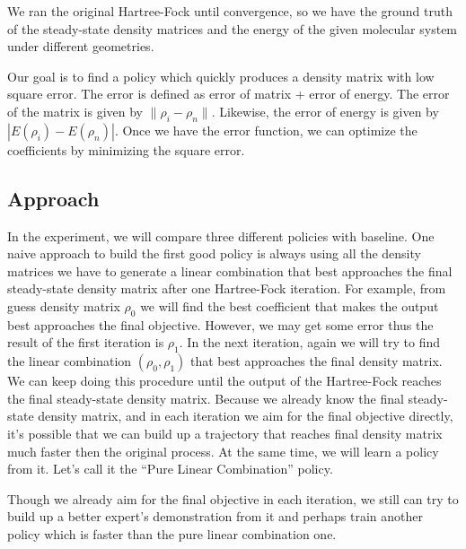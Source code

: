 \documentclass[twoside,11pt]{article}
\begin{document}

We ran the original Hartree-Fock until convergence, so we have the ground truth of the steady-state density matrices and the energy of the given molecular system under different geometries. 

Our goal is to find a policy which quickly produces a density matrix with low square error. The error is defined as error of matrix + error of energy. The error of the matrix is given by $\|\rho_i-\rho_n\|$. Likewise, the error of energy is given by $|E(\rho_i)-E(\rho_n)|$. Once we have the error function, we can optimize the coefficients by minimizing the square error.



\subsection{Approach}


In the experiment, we will compare three different policies with baseline.
One naive approach to build the first good policy is always using all the density matrices we have to generate a linear combination that best approaches the final steady-state density matrix after one Hartree-Fock iteration.  For example, from guess density matrix $\rho_0$ we will find the best coefficient that makes the output best approaches the final objective. However, we may get some error thus the result of the first iteration is $\rho_1$.  In the next iteration, again we will try to find the linear combination $(\rho_0, \rho_1)$ that best approaches the final density matrix. We can keep doing this procedure until the output of the Hartree-Fock reaches the final steady-state density matrix.
Because we already know the final steady-state density matrix, and in each iteration we aim for the final objective directly, it's possible that we can build up a trajectory that reaches final density matrix much faster then the original process. At the same time, we will learn a policy from it. Let's call it the ``Pure Linear Combination'' policy.

Though we already aim for the final objective in each iteration, we still can try to build up a better expert's demonstration from it and perhaps train another policy which is faster than the pure linear combination one.
\end{document}
